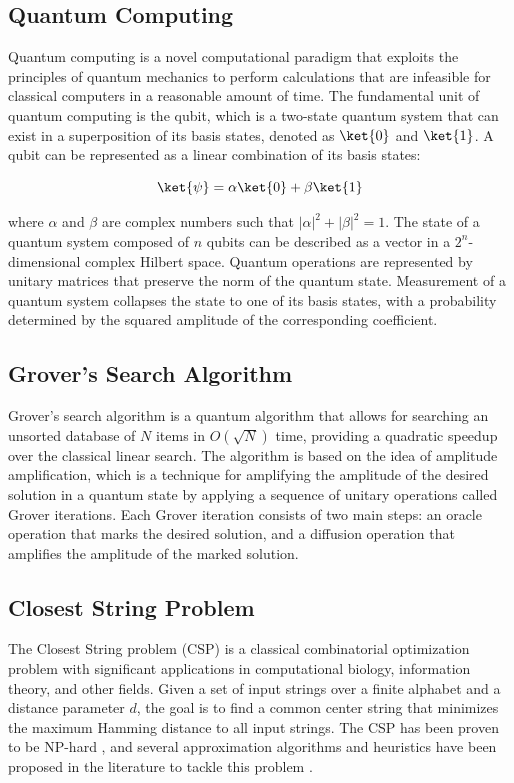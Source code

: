 \subsection{Quantum Computing}

Quantum computing is a novel computational paradigm that exploits the principles of quantum mechanics to perform calculations that are infeasible for classical computers in a reasonable amount of time. The fundamental unit of quantum computing is the qubit, which is a two-state quantum system that can exist in a superposition of its basis states, denoted as $\ket{0}$ and $\ket{1}$. A qubit can be represented as a linear combination of its basis states:

\[
\ket{\psi} = \alpha \ket{0} + \beta \ket{1}
\]

where $\alpha$ and $\beta$ are complex numbers such that $|\alpha|^2 + |\beta|^2 = 1$. The state of a quantum system composed of $n$ qubits can be described as a vector in a $2^n$-dimensional complex Hilbert space. Quantum operations are represented by unitary matrices that preserve the norm of the quantum state. Measurement of a quantum system collapses the state to one of its basis states, with a probability determined by the squared amplitude of the corresponding coefficient.

\subsection{Grover's Search Algorithm}

Grover's search algorithm \cite{grover1996fast} is a quantum algorithm that allows for searching an unsorted database of $N$ items in $O(\sqrt{N})$ time, providing a quadratic speedup over the classical linear search. The algorithm is based on the idea of amplitude amplification, which is a technique for amplifying the amplitude of the desired solution in a quantum state by applying a sequence of unitary operations called Grover iterations. Each Grover iteration consists of two main steps: an oracle operation that marks the desired solution, and a diffusion operation that amplifies the amplitude of the marked solution.

\subsection{Closest String Problem}

The Closest String problem (CSP) is a classical combinatorial optimization problem with significant applications in computational biology, information theory, and other fields. Given a set of input strings over a finite alphabet and a distance parameter $d$, the goal is to find a common center string that minimizes the maximum Hamming distance to all input strings. The CSP has been proven to be NP-hard \cite{frances1999covering}, and several approximation algorithms and heuristics have been proposed in the literature to tackle this problem \cite{ma2008new,gramm2003fixed,davies2011closest}.

